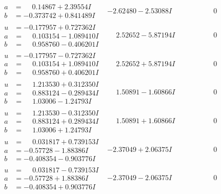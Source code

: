 \documentclass[1p]{elsarticle_modified}
\theoremstyle{definition}
\begin{document}
$$\begin{array}{c|c|c}
\begin{aligned}
a &= \phantom{-}0.14867 + 2.39554 I \\
b &= -0.373742 + 0.841489 I\end{aligned}
 & -2.62480 - 2.53088 I & \phantom{-0.000000 } 0 \\ \hline\begin{aligned}
u &= -0.177957 + 0.727362 I \\
a &= \phantom{-}0.103154 - 1.089410 I \\
b &= \phantom{-}0.958760 - 0.406201 I\end{aligned}
 & \phantom{-}2.52652 - 5.87194 I & \phantom{-0.000000 } 0 \\ \hline\begin{aligned}
u &= -0.177957 - 0.727362 I \\
a &= \phantom{-}0.103154 + 1.089410 I \\
b &= \phantom{-}0.958760 + 0.406201 I\end{aligned}
 & \phantom{-}2.52652 + 5.87194 I & \phantom{-0.000000 } 0 \\ \hline\begin{aligned}
u &= \phantom{-}1.213530 + 0.312350 I \\
a &= \phantom{-}0.883124 - 0.289434 I \\
b &= \phantom{-}1.03006 - 1.24793 I\end{aligned}
 & \phantom{-}1.50891 - 1.60866 I & \phantom{-0.000000 } 0 \\ \hline\begin{aligned}
u &= \phantom{-}1.213530 - 0.312350 I \\
a &= \phantom{-}0.883124 + 0.289434 I \\
b &= \phantom{-}1.03006 + 1.24793 I\end{aligned}
 & \phantom{-}1.50891 + 1.60866 I & \phantom{-0.000000 } 0 \\ \hline\begin{aligned}
u &= \phantom{-}0.031817 + 0.739153 I \\
a &= -0.57728 - 1.88386 I \\
b &= -0.408354 - 0.903776 I\end{aligned}
 & -2.37049 + 2.06375 I & \phantom{-0.000000 } 0 \\ \hline\begin{aligned}
u &= \phantom{-}0.031817 - 0.739153 I \\
a &= -0.57728 + 1.88386 I \\
b &= -0.408354 + 0.903776 I\end{aligned}
 & -2.37049 - 2.06375 I & \phantom{-0.000000 } 0\\

\end{array}$$
\end{document}
